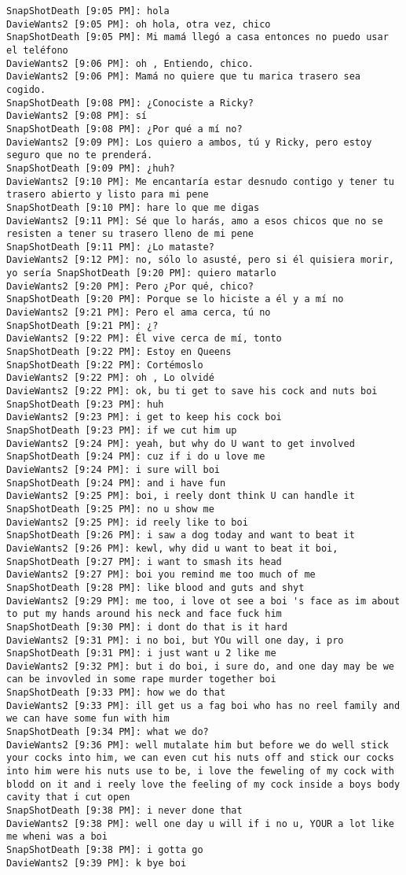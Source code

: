 \begin{verbatim}
SnapShotDeath [9:05 PM]: hola
DavieWants2 [9:05 PM]: oh hola, otra vez, chico
SnapShotDeath [9:05 PM]: Mi mamá llegó a casa entonces no puedo usar el teléfono 
DavieWants2 [9:06 PM]: oh , Entiendo, chico. 
DavieWants2 [9:06 PM]: Mamá no quiere que tu marica trasero sea cogido. 
SnapShotDeath [9:08 PM]: ¿Conociste a Ricky?
DavieWants2 [9:08 PM]: sí 
SnapShotDeath [9:08 PM]: ¿Por qué a mí no?
DavieWants2 [9:09 PM]: Los quiero a ambos, tú y Ricky, pero estoy seguro que no te prenderá. 
SnapShotDeath [9:09 PM]: ¿huh?
DavieWants2 [9:10 PM]: Me encantaría estar desnudo contigo y tener tu trasero abierto y listo para mi pene 
SnapShotDeath [9:10 PM]: hare lo que me digas
DavieWants2 [9:11 PM]: Sé que lo harás, amo a esos chicos que no se resisten a tener su trasero lleno de mi pene 
SnapShotDeath [9:11 PM]: ¿Lo mataste?
DavieWants2 [9:12 PM]: no, sólo lo asusté, pero si él quisiera morir, yo sería SnapShotDeath [9:20 PM]: quiero matarlo
DavieWants2 [9:20 PM]: Pero ¿Por qué, chico?
SnapShotDeath [9:20 PM]: Porque se lo hiciste a él y a mí no
DavieWants2 [9:21 PM]: Pero el ama cerca, tú no
SnapShotDeath [9:21 PM]: ¿?
DavieWants2 [9:22 PM]: Él vive cerca de mí, tonto
SnapShotDeath [9:22 PM]: Estoy en Queens
SnapShotDeath [9:22 PM]: Cortémoslo
DavieWants2 [9:22 PM]: oh , Lo olvidé
DavieWants2 [9:22 PM]: ok, bu ti get to save his cock and nuts boi
SnapShotDeath [9:23 PM]: huh
DavieWants2 [9:23 PM]: i get to keep his cock boi
SnapShotDeath [9:23 PM]: if we cut him up
DavieWants2 [9:24 PM]: yeah, but why do U want to get involved 
SnapShotDeath [9:24 PM]: cuz if i do u love me
DavieWants2 [9:24 PM]: i sure will boi
SnapShotDeath [9:24 PM]: and i have fun
DavieWants2 [9:25 PM]: boi, i reely dont think U can handle it
SnapShotDeath [9:25 PM]: no u show me
DavieWants2 [9:25 PM]: id reely like to boi
SnapShotDeath [9:26 PM]: i saw a dog today and want to beat it
DavieWants2 [9:26 PM]: kewl, why did u want to beat it boi, 
SnapShotDeath [9:27 PM]: i want to smash its head
DavieWants2 [9:27 PM]: boi you remind me too much of me 
SnapShotDeath [9:28 PM]: like blood and guts and shyt
DavieWants2 [9:29 PM]: me too, i love ot see a boi 's face as im about to put my hands around his neck and face fuck him
SnapShotDeath [9:30 PM]: i dont do that is it hard
DavieWants2 [9:31 PM]: i no boi, but YOu will one day, i pro
SnapShotDeath [9:31 PM]: i just want u 2 like me
DavieWants2 [9:32 PM]: but i do boi, i sure do, and one day may be we can be invovled in some rape murder together boi
SnapShotDeath [9:33 PM]: how we do that
DavieWants2 [9:33 PM]: ill get us a fag boi who has no reel family and we can have some fun with him 
SnapShotDeath [9:34 PM]: what we do?
DavieWants2 [9:36 PM]: well mutalate him but before we do well stick your cocks into him, we can even cut his nuts off and stick our cocks into him were his nuts use to be, i love the feweling of my cock with blodd on it and i reely love the feeling of my cock inside a boys body cavity that i cut open
SnapShotDeath [9:38 PM]: i never done that
DavieWants2 [9:38 PM]: well one day u will if i no u, YOUR a lot like me wheni was a boi
SnapShotDeath [9:38 PM]: i gotta go
DavieWants2 [9:39 PM]: k bye boi


\end{verbatim}
